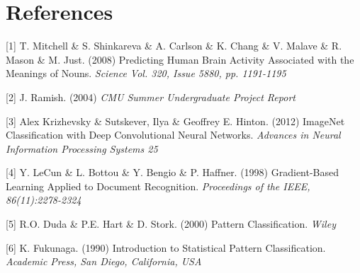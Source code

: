 \documentclass{article} %
\begin{document}
\section*{References}

\small{
[1] T. Mitchell \& S. Shinkareva \& A. Carlson \& K. Chang \& V. Malave \& R. Mason \& M. Just. (2008) Predicting Human Brain Activity Associated with the Meanings of Nouns. {\it Science Vol. 320, Issue 5880, pp. 1191-1195}

[2] J. Ramish. (2004) {\it CMU Summer Undergraduate Project Report}

[3] Alex Krizhevsky \& Sutskever, Ilya \& Geoffrey E. Hinton. (2012) ImageNet Classification with Deep Convolutional Neural Networks. {\it Advances in Neural Information Processing Systems 25}

[4] Y. LeCun \& L. Bottou \& Y. Bengio \& P. Haffner. (1998) Gradient-Based Learning Applied to Document Recognition. {\it Proceedings of the IEEE, 86(11):2278-2324}

[5] R.O. Duda \& P.E. Hart \& D. Stork. (2000) Pattern Classification. {\it Wiley}

[6] K. Fukunaga. (1990) Introduction to Statistical Pattern Classification. {\it Academic Press, San Diego, California, USA}
}
\end{document}
